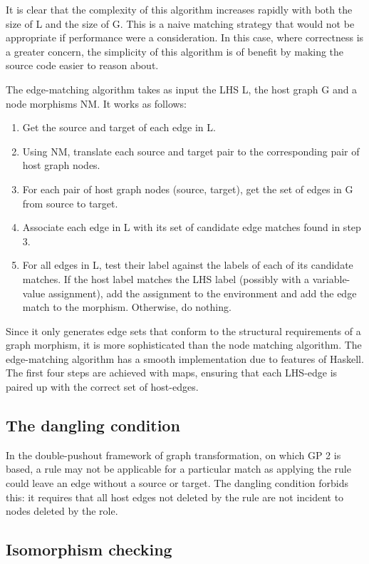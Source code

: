 It is clear that the complexity of this algorithm increases rapidly with both the size of L and the size of G. This is a naive matching strategy that would not be appropriate if performance were a consideration. In this case, where correctness is a greater concern, the simplicity of this algorithm is of benefit by making the source code easier to reason about.


The edge-matching algorithm takes as input the LHS L, the host graph G and a node morphisms NM. It works as follows:


\begin{enumerate}
	\item Get the source and target of each edge in L.
	\item Using NM, translate each source and target pair to the corresponding pair of host graph nodes.
	\item For each pair of host graph nodes (source, target), get the set of edges in G from source to target.
	\item Associate each edge in L with its set of candidate edge matches found in step 3.
	\item For all edges in L, test their label against the labels of each of its candidate matches. If the host label matches the LHS label (possibly with a variable-value assignment), add the assignment to the environment and add the edge match to the morphism. Otherwise, do nothing.
\end{enumerate}


Since it only generates edge sets that conform to the structural requirements of a graph morphism, it is more sophisticated than the node matching algorithm. The edge-matching algorithm has a smooth implementation due to features of Haskell. The first four steps are achieved with maps, ensuring that each LHS-edge is paired up with the correct set of host-edges.


\subsection{The dangling condition}

In the double-pushout framework of graph transformation, on which GP 2 is based, a rule may not be applicable for a particular match as applying the rule could leave an edge without a source or target. The dangling condition forbids this: it requires that all host edges not deleted by the rule are not incident to nodes deleted by the role.


\subsection{Isomorphism checking}


